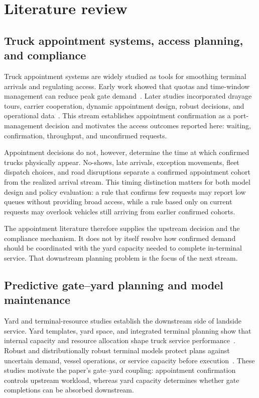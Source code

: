 \documentclass[preprint,12pt,authoryear,a4paper]{elsarticle}
\begin{document}
\section{Literature review}
\label{sec:literature-review}

\subsection{Truck appointment systems, access planning, and compliance}

Truck appointment systems are widely studied as tools for smoothing terminal arrivals and regulating access. Early work showed that quotas and time-window management can reduce peak gate demand~\citep{GuanLiu2009GateAppointment}. Later studies incorporated drayage tours, carrier cooperation, dynamic appointment design, robust decisions, and operational data~\citep{TorkjaziHuynhShiri2018TruckTours,ImYuLee2020TruckAppointmentCooperation,AzabKaramEltawil2017DynamicCollaborativeTAS,LiJiaTaoLin2024RobustGateAppointment,SunShiZheng2025DataDrivenTAS}. This stream establishes appointment confirmation as a port-management decision and motivates the access outcomes reported here: waiting, confirmation, throughput, and unconfirmed requests.

Appointment decisions do not, however, determine the time at which confirmed trucks physically appear. No-shows, late arrivals, exception movements, fleet dispatch choices, and road disruptions separate a confirmed appointment cohort from the realized arrival stream. This timing distinction matters for both model design and policy evaluation: a rule that confirms few requests may report low queues without providing broad access, while a rule based only on current requests may overlook vehicles still arriving from earlier confirmed cohorts.

The appointment literature therefore supplies the upstream decision and the compliance mechanism. It does not by itself resolve how confirmed demand should be coordinated with the yard capacity needed to complete in-terminal service. That downstream planning problem is the focus of the next stream.

\subsection{Predictive gate--yard planning and model maintenance}

Yard and terminal-resource studies establish the downstream side of landside service. Yard templates, yard space, and integrated terminal planning show that internal capacity and resource allocation shape truck service performance~\citep{TanHeWang2017FlexibleYardTemplate,ZhenEtAl2022BerthYard}. Robust and distributionally robust terminal models protect plans against uncertain demand, vessel operations, or service capacity before execution~\citep{RodriguesAgra2022Survey,AgraRodrigues2022DROBAP,LiJiaTaoLin2024RobustGateAppointment}. These studies motivate the paper's gate--yard coupling: appointment confirmation controls upstream workload, whereas yard capacity determines whether gate completions can be absorbed downstream.
\end{document}
